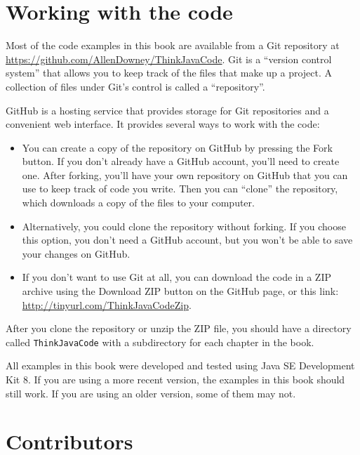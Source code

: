 \documentclass[12pt]{book}
\theoremstyle{exercise}
\begin{document}
\section*{Working with the code}
\label{code}

Most of the code examples in this book are available from a Git repository at \url{https://github.com/AllenDowney/ThinkJavaCode}.
Git is a ``version control system'' that allows you to keep track of the files that make up a project.
A collection of files under Git's control is called a ``repository''.


GitHub is a hosting service that provides storage for Git repositories and a convenient web interface.
It provides several ways to work with the code:

\begin{itemize}

\item You can create a copy of the repository on GitHub by pressing the {\sf Fork} button.
If you don't already have a GitHub account, you'll need to create one.
After forking, you'll have your own repository on GitHub that you can use to keep track of code you write.
Then you can ``clone'' the repository, which downloads a copy of the files to your computer.

\item Alternatively, you could clone the repository without forking.
If you choose this option, you don't need a GitHub account, but you won't be able to save your changes on GitHub.

\item If you don't want to use Git at all, you can download the code in a ZIP archive using the {\sf Download ZIP} button on the GitHub page, or this link: \url{http://tinyurl.com/ThinkJavaCodeZip}.

\end{itemize}

After you clone the repository or unzip the ZIP file, you should have a directory called {\tt ThinkJavaCode} with a subdirectory for each chapter in the book.

All examples in this book were developed and tested using Java SE Development Kit 8.
If you are using a more recent version, the examples in this book should still work.
If you are using an older version, some of them may not.


\section*{Contributors}
\end{document}
